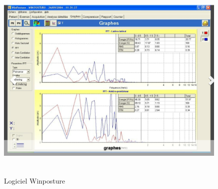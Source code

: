 \begin{figure}[ht]
  \centering
  \includegraphics[height=10cm]{images/pression_plantaire/winposture2.png}
  \caption{Logiciel Winposture}\label{fig:winposture2}
\end{figure}
